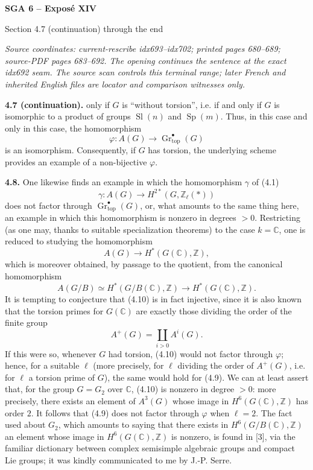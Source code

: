 \documentclass[11pt]{article}
\newcommand{\C}{\mathbb C}
\newcommand{\Z}{\mathbb Z}
\newcommand{\Zell}{\mathbb Z_{\ell}}
\newcommand{\Gtop}{\operatorname{Gr}_{\mathrm{top}}}
\begin{document}
\begin{center}
{\Large\bfseries SGA 6 -- Expos\'e XIV}\par
\medskip
{\large Section 4.7 (continuation) through the end}
\end{center}

\noindent\textit{Source coordinates: current-rescribe idx693--idx702;
printed pages 680--689; source-PDF pages 683--692. The opening continues the
sentence at the exact idx692 seam. The source scan controls this terminal
range; later French and inherited English files are locator and comparison
witnesses only.}

\bigskip

\noindent\textbf{4.7 (continuation).}
only if $G$ is ``without torsion'', i.e. if and only if $G$ is isomorphic to
a product of groups $\operatorname{Sl}(n)$ and $\operatorname{Sp}(m)$. Thus,
in this case and only in this case, the homomorphism
\[
 \varphi:A(G)\longrightarrow\Gtop^\bullet(G)
\]
is an isomorphism. Consequently, if $G$ has torsion, the underlying scheme
provides an example of a non-bijective $\varphi$.

\noindent\textbf{4.8.}
One likewise finds an example in which the homomorphism $\gamma$ of (4.1)
\begin{equation}\tag{4.9}
 \gamma:A(G)\longrightarrow H^{2*}(G,\Zell(*))
\end{equation}
does not factor through $\Gtop^\bullet(G)$, or, what amounts to the same
thing here, an example in which this homomorphism is nonzero in degrees
$>0$. Restricting (as one may, thanks to suitable specialization theorems)
to the case $k=\C$, one is reduced to studying the homomorphism
\begin{equation}\tag{4.10}
 A(G)\longrightarrow H^*(G(\C),\Z),
\end{equation}
which is moreover obtained, by passage to the quotient, from the canonical
homomorphism
\[
 A(G/B)\simeq H^*(G/B(\C),\Z)
 \longrightarrow H^*(G(\C),\Z).
\]
It is tempting to conjecture that (4.10) is in fact injective, since it is
also known that the torsion primes for $G(\C)$ are exactly those dividing
the order of the finite group
\[
 A^+(G)=\coprod_{i>0}A^i(G).
\]
If this were so, whenever $G$ had torsion, (4.10) would not factor through
$\varphi$; hence, for a suitable $\ell$ (more precisely, for $\ell$ dividing
the order of $A^+(G)$, i.e. for $\ell$ a torsion prime of $G$), the same
would hold for (4.9). We can at least assert that, for the group $G=G_2$
over $\C$, (4.10) is nonzero in degree $>0$: more precisely, there exists an
element of $A^3(G)$ whose image in $H^6(G(\C),\Z)$ has order $2$. It follows
that (4.9) does not factor through $\varphi$ when $\ell=2$. The fact used
about $G_2$, which amounts to saying that there exists in
$H^6(G/B(\C),\Z)$ an element whose image in $H^6(G(\C),\Z)$ is nonzero, is
found in [3], via the familiar dictionary between complex semisimple
algebraic groups and compact Lie groups; it was kindly communicated to me
by J.-P. Serre.
\end{document}
